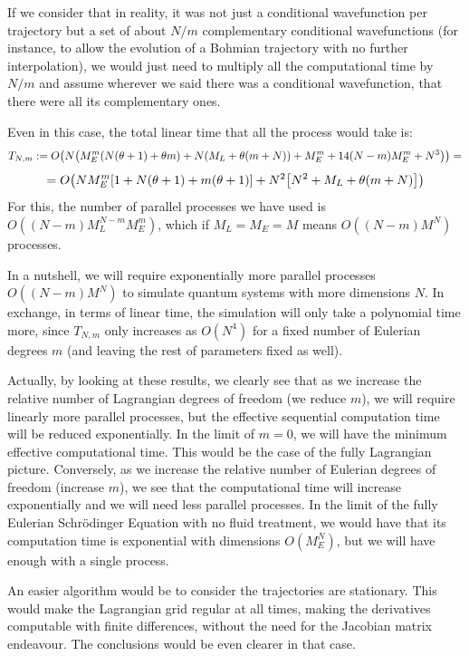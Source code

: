 \documentclass[11pt, a4paper]{article} %
\begin{document}
If we consider that in reality, it was not just a conditional wavefunction per trajectory but a set of about $N/m$ complementary conditional wavefunctions (for instance, to allow the evolution of a Bohmian trajectory with no further interpolation), we would just need to multiply all the computational time by $N/m$ and assume wherever we said there was a conditional wavefunction, that there were all its complementary ones.

Even in this case, the total linear time that all the process would take is:
\begin{equation}
T_{N,m}:=O\qty(N\qty(M_E^m(N(\theta+1)+\theta m)+N(M_L+\theta(m+N))+M_E^m+14(N-m)M_E^m+N^3))=
\end{equation}
$$
=O\qty(NM_E^m\qty[1+N(\theta+1)+m(\theta+1)]+N^2\qty[N^2+M_L+\theta(m+N) ])
$$
For this, the number of parallel processes we have used is $O((N-m)M_L^{N-m}M_E^{m})$, which if $M_L=M_E=M$ means $O((N-m)M^{N})$ processes.

In a nutshell, we will require exponentially more parallel processes $O((N-m)M^{N})$ to simulate quantum systems with more dimensions $N$. In exchange, in terms of linear time, the simulation will only take a polynomial time more, since $T_{N,m}$ only increases as $O(N^4)$ for a fixed number of Eulerian degrees $m$ (and leaving the rest of parameters fixed as well).

Actually, by looking at these results, we clearly see that as we increase the relative number of Lagrangian degrees of freedom (we reduce $m$), we will require linearly more parallel processes, but the effective sequential computation time will be reduced exponentially. In the limit of $m=0$, we will have the minimum effective computational time. This would be the case of the fully Lagrangian picture. Conversely, as we increase the relative number of Eulerian degrees of freedom (increase $m$), we see that the computational time will increase exponentially and we will need less parallel processes. In the limit of the fully Eulerian Schrödinger Equation with no fluid treatment, we would have that its computation time is exponential with dimensions $O(M_E^N)$, but we will have enough with a single process.

An easier algorithm would be to consider the trajectories are stationary. This would make the Lagrangian grid regular at all times, making the derivatives computable with finite differences, without the need for the Jacobian matrix endeavour. The conclusions would be even clearer in that case.
\end{document}
